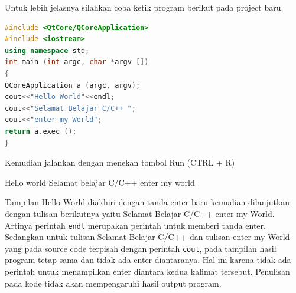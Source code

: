 Untuk lebih jelasnya silahkan coba ketik program berikut pada project
baru.

\begin{lstlisting}[language=c++, caption= Contoh struktur program C++]
#include <QtCore/QCoreApplication>  
#include <iostream>  
using namespace std;  
int main (int argc, char *argv [])  
{  
QCoreApplication a (argc, argv);  
cout<<"Hello World"<<endl;  
cout<<"Selamat Belajar C/C++ ";  
cout<<"enter my World";  
return a.exec ();  
}
\end{lstlisting}

Kemudian jalankan dengan menekan tombol Run (CTRL + R)

\begin{lcverbatim}
Hello world
Selamat belajar C/C++ enter my world
\end{lcverbatim}


Tampilan Hello World diakhiri dengan tanda enter baru kemudian
dilanjutkan dengan tulisan berikutnya yaitu Selamat Belajar C/C++ enter
my World. Artinya perintah \texttt{endl} merupakan perintah untuk
memberi tanda enter. Sedangkan untuk tulisan Selamat Belajar C/C++ dan
tulisan enter my World yang pada source code terpisah dengan perintah
\texttt{cout}, pada tampilan hasil program tetap sama dan tidak ada
enter diantaranya. Hal ini karena tidak ada perintah untuk menampilkan
enter diantara kedua kalimat tersebut. Penulisan pada kode tidak akan
mempengaruhi hasil output program.
